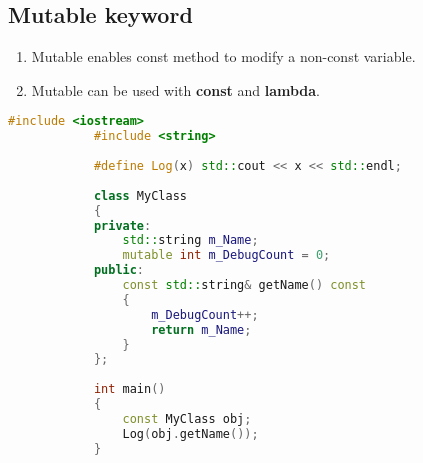 \documentclass{article}
\begin{document}
    \subsection{Mutable keyword}
        \begin{enumerate}
            \item Mutable enables const method to modify a non-const variable. 
            \item Mutable can be used with \textbf{const} and \textbf{lambda}.
        \end{enumerate}
        \begin{lstlisting}[language=C++, caption=Mutable example with const method]
            #include <iostream>
            #include <string>
            
            #define Log(x) std::cout << x << std::endl;
            
            class MyClass
            {
            private:
            	std::string m_Name;
            	mutable int m_DebugCount = 0;
            public:
            	const std::string& getName() const
            	{
            		m_DebugCount++;
            		return m_Name;
            	}
            };
            
            int main()
            {
            	const MyClass obj;
            	Log(obj.getName());
            }
        \end{lstlisting}
\end{document}
